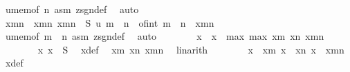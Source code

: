 \begin{isabellebody}
\ u{\isacharunderscore}{\kern0pt}mem{\isacharbrackleft}{\kern0pt}of\ n{\isacharbrackright}{\kern0pt}\ asm\ zsgn{\isacharunderscore}{\kern0pt}def\ \isamarkupfalse%
\ auto\isanewline
\ \ \ \ \ \ \isamarkupfalse%
\ x{\isacharunderscore}{\kern0pt}m{\isacharunderscore}{\kern0pt}n\ \ x{\isacharunderscore}{\kern0pt}m{\isacharunderscore}{\kern0pt}n{\isacharcolon}{\kern0pt}\ {\isachardoublequoteopen}x{\isacharunderscore}{\kern0pt}m{\isacharunderscore}{\kern0pt}n\ {\isasymin}\ S{\isachardoublequoteclose}\ {\isachardoublequoteopen}u\ {\isacharparenleft}{\kern0pt}m\ {\isacharplus}{\kern0pt}\ n{\isacharparenright}{\kern0pt}\ {\isacharequal}{\kern0pt}\ {\isasymlfloor}of{\isacharunderscore}{\kern0pt}int\ {\isacharparenleft}{\kern0pt}m\ {\isacharplus}{\kern0pt}\ n{\isacharparenright}{\kern0pt}\ {\isacharasterisk}{\kern0pt}\ x{\isacharunderscore}{\kern0pt}m{\isacharunderscore}{\kern0pt}n{\isasymrfloor}{\isachardoublequoteclose}\ \isamarkupfalse%
\ u{\isacharunderscore}{\kern0pt}mem{\isacharbrackleft}{\kern0pt}of\ {\isachardoublequoteopen}m\ {\isacharplus}{\kern0pt}\ n{\isachardoublequoteclose}{\isacharbrackright}{\kern0pt}\ asm\ zsgn{\isacharunderscore}{\kern0pt}def\ \isamarkupfalse%
\ auto\isanewline
\isanewline
\ \ \ \ \ \ \isamarkupfalse%
\ x\ \ {\isachardoublequoteopen}x\ {\isacharequal}{\kern0pt}\ max\ {\isacharparenleft}{\kern0pt}max\ x{\isacharunderscore}{\kern0pt}m\ x{\isacharunderscore}{\kern0pt}n{\isacharparenright}{\kern0pt}\ x{\isacharunderscore}{\kern0pt}m{\isacharunderscore}{\kern0pt}n{\isachardoublequoteclose}\isanewline
\ \ \ \ \ \ \isamarkupfalse%
\ x{\isacharcolon}{\kern0pt}\ {\isachardoublequoteopen}x\ {\isasymin}\ S{\isachardoublequoteclose}\ \isamarkupfalse%
\ x{\isacharunderscore}{\kern0pt}def\ \isamarkupfalse%
\ x{\isacharunderscore}{\kern0pt}m\ x{\isacharunderscore}{\kern0pt}n\ x{\isacharunderscore}{\kern0pt}m{\isacharunderscore}{\kern0pt}n\ \isamarkupfalse%
\ linarith\isanewline
\isanewline
\ \ \ \ \ \ \isamarkupfalse%
\ {\isachardoublequoteopen}x\ {\isasymge}\ x{\isacharunderscore}{\kern0pt}m{\isachardoublequoteclose}\ {\isachardoublequoteopen}x\ {\isasymge}\ x{\isacharunderscore}{\kern0pt}n{\isachardoublequoteclose}\ {\isachardoublequoteopen}x\ {\isasymge}\ x{\isacharunderscore}{\kern0pt}m{\isacharunderscore}{\kern0pt}n{\isachardoublequoteclose}\ \isamarkupfalse%
\ x{\isacharunderscore}{\kern0pt}def\ \isamarkupfalse%

\end{isabellebody}
